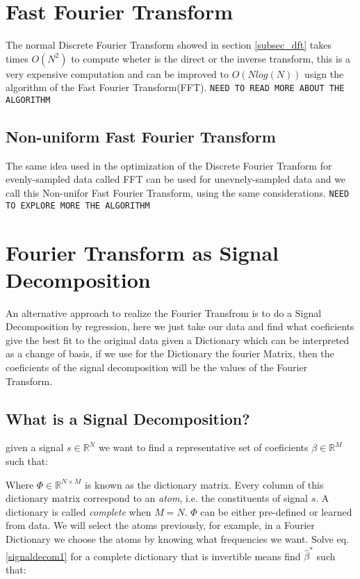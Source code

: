 \section{Fast Fourier Transform}
\newp The normal Discrete Fourier Transform showed in section \ref{subsec_dft} takes times $O(N^2)$ to compute wheter is the direct or the inverse transform, this is a very expensive computation and can be improved to $O(N log(N))$ usign the algorithm of the Fast Fourier Transform(FFT). \texttt{NEED TO READ MORE ABOUT THE ALGORITHM}

\subsection{Non-uniform Fast Fourier Transform}
\newp The same idea used in the optimization of the Discrete Fourier Tranform for evenly-sampled data called FFT can be used for unevnely-sampled data and we call this Non-unifor Fast Fourier Transform, using the same considerations. \texttt{NEED TO EXPLORE MORE THE ALGORITHM}

\section{Fourier Transform as Signal Decomposition}
\newp An alternative approach to realize the Fourier Transfrom is to do a Signal Decomposition by regression, here we just take our data and find what coeficients give the best fit to the original data given a Dictionary which can be interpreted as a change of basis, if we use for the Dictionary the fourier Matrix, then the coeficients of the signal decomposition will be the values of the Fourier Transform.

\subsection{What is a Signal Decomposition?}
\newp given a signal $s \in \mathbb{R}^{N}$ we want to find a representative set of coeficients $\beta \in\mathbb{R}^{M}$ such that:


\newp Where $\Phi \in \mathbb{R}^{N \times M}$ is known as the dictionary matrix. Every column of this dictionary matrix correspond to an \textit{atom}, i.e. the constituents of signal $s$. A dictionary is called \textit{complete} when $M = N$. $\Phi$ can be either pre-defined or learned from data. We will select the atoms previously, for example, in a Fourier Dictionary we choose the atoms by knowing what frequencies we want.
\newp Solve eq. \ref{signaldecom1} for a complete dictionary that is invertible means find $\hat{\beta}^{*}$ such that:

